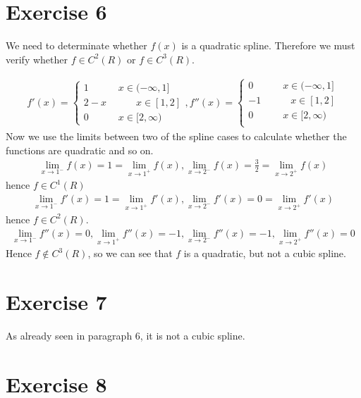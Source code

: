 \section{Exercise 6}
We need to determinate whether $f(x)$ is a quadratic spline.
Therefore we must verify whether $f \in C^2(R)$ or $f \in C^3(R)$.

\begin{gather*}
f' (x) = \begin{cases}
1 \quad\quad\quad x \in (-\infty,1] \\
2-x \quad\quad\quad x \in [1,2] \\
0 \quad\quad\quad x\in [2,\infty)
\end{cases},
f''(x) =\begin{cases}
0 \quad\quad\quad x \in (-\infty,1] \\
-1 \quad\quad\quad x \in [1,2] \\
0 \quad\quad\quad x\in [2,\infty) \\
\end{cases}
\end{gather*}
Now we use the limits between two of the spline cases to calculate whether the functions are quadratic and so on.
\begin{gather*}
\lim_{x \to 1^{-}} f(x) = 1 =  \lim_{x \to 1^{+}} f(x) , \lim_{x \to 2^{-}} f(x) = \frac{3}{2} = \lim_{x \to 2^{+}} f(x)
\end{gather*}
hence $f \in C^1(R)$
\begin{gather*}
\lim_{x \to 1^{-}} f'(x) = 1 =  \lim_{x \to 1^{+}} f'(x) , \lim_{x \to 2^{-}} f'(x) = 0 = \lim_{x \to 2^{+}} f'(x)
\end{gather*}
hence $f \in C^2(R)$.
\begin{gather*}
\lim_{x \to 1^{-}} f''(x) = 0, \lim_{x \to 1^{+}} f''(x) = -1 , \lim_{x \to 2^{-}} f''(x) = -1 , \lim_{x \to 2^{+}} f''(x) =0
\end{gather*}
Hence $f \not \in C^3(R)$, so we can see that $f$ is a quadratic, but not a cubic spline.
\section{Exercise 7}
As already seen in paragraph $6$, it is not a cubic spline.
\section{Exercise 8}

